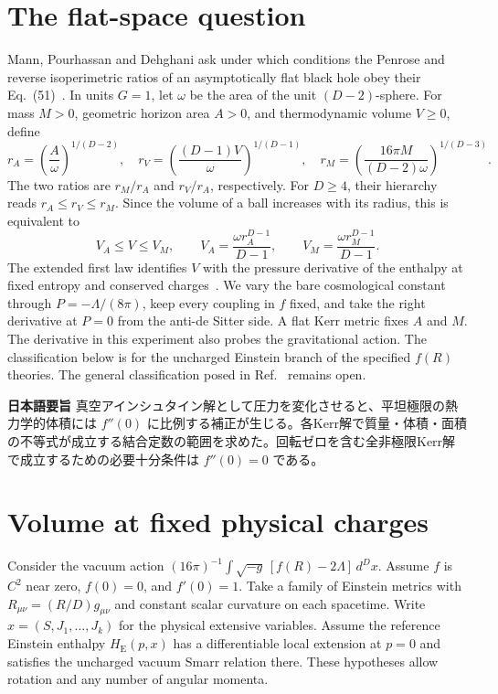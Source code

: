 \documentclass[11pt,a4paper]{article}
\newcommand{\HE}{H_{\mathrm E}}
\begin{document}
\section{The flat-space question}\label{sec:question}
Mann, Pourhassan and Dehghani ask under which conditions the Penrose and reverse isoperimetric ratios of an asymptotically flat black hole obey their Eq.~(51)~\cite{mann}. In units \(G=1\), let \(\omega\) be the area of the unit \((D-2)\)-sphere. For mass \(M>0\), geometric horizon area \(A>0\), and thermodynamic volume \(V\geq0\), define
\begin{equation}\label{eq:radii}
 r_A=\left(\frac{A}{\omega}\right)^{\!1/(D-2)},\quad
 r_V=\left(\frac{(D-1)V}{\omega}\right)^{\!1/(D-1)},\quad
 r_M=\left(\frac{16\pi M}{(D-2)\omega}\right)^{\!1/(D-3)} .
\end{equation}
The two ratios are \(r_M/r_A\) and \(r_V/r_A\), respectively. For \(D\geq4\), their hierarchy reads \(r_A\leq r_V\leq r_M\). Since the volume of a ball increases with its radius, this is equivalent to
\begin{equation}\label{eq:bounds}
 V_A\leq V\leq V_M,\qquad V_A=\frac{\omega r_A^{D-1}}{D-1},\qquad
 V_M=\frac{\omega r_M^{D-1}}{D-1}.
\end{equation}
The extended first law identifies \(V\) with the pressure derivative of the enthalpy at fixed entropy and conserved charges~\cite{cvetic,dolan}. We vary the bare cosmological constant through \(P=-\Lambda/(8\pi)\), keep every coupling in \(f\) fixed, and take the right derivative at \(P=0\) from the anti-de Sitter side. A flat Kerr metric fixes \(A\) and \(M\). The derivative in this experiment also probes the gravitational action. The classification below is for the uncharged Einstein branch of the specified \(f(R)\) theories. The general classification posed in Ref.~\cite{mann} remains open.

\smallskip
{\small\noindent\textbf{日本語要旨}\quad
真空アインシュタイン解として圧力を変化させると、平坦極限の熱力学的体積には \(f''(0)\) に比例する補正が生じる。各Kerr解で質量・体積・面積の不等式が成立する結合定数の範囲を求めた。回転ゼロを含む全非極限Kerr解で成立するための必要十分条件は \(f''(0)=0\) である。\par}

\newpage
\section{Volume at fixed physical charges}\label{sec:shift}
Consider the vacuum action \((16\pi)^{-1}\int \sqrt{-g}\,[f(R)-2\Lambda]\,d^D x\). Assume \(f\) is \(C^2\) near zero, \(f(0)=0\), and \(f'(0)=1\). Take a family of Einstein metrics with \(R_{\mu\nu}=(R/D)g_{\mu\nu}\) and constant scalar curvature on each spacetime. Write \(x=(S,J_1,\ldots,J_k)\) for the physical extensive variables. Assume the reference Einstein enthalpy \(\HE(p,x)\) has a differentiable local extension at \(p=0\) and satisfies the uncharged vacuum Smarr relation there. These hypotheses allow rotation and any number of angular momenta.
\end{document}
